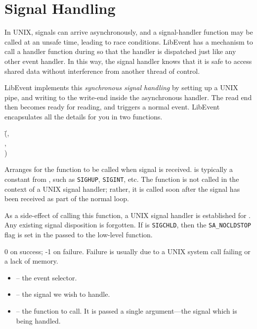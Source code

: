 \documentclass{article}
\newcommand{\Le}{\textsf{LibEvent}}
\begin{document}
\section{Signal Handling}

In UNIX, signals can arrive asynchronously, and a signal-handler
function may be called at an unsafe time, leading to race conditions.
\Le{} has a mechanism to call a handler function during
 so that the handler is dispatched just like
any other event handler.  In this way, the signal handler knows that
it is safe to access shared data without interference from another
thread of control.

\Le{} implements this \emph{synchronous signal handling} by setting up
a UNIX pipe, and writing to the write-end inside the asynchronous
handler.  The read end then becomes ready for reading, and triggers
a normal event.  \Le{} encapsulates all the details for you in
two functions.

{(\=,\\
  \> ,\\
  \> \type{)})}
{Arranges for the function  to be called when signal
   is received.   is typically a constant from
  , such as \texttt{SIGHUP}, \texttt{SIGINT}, etc.
  The  function is not called in the context of a UNIX
  signal handler; rather, it is called soon after the signal has been
  received as part of the normal  loop.

  As a side-effect of calling this function, a UNIX signal handler
  is established for .  Any existing signal disposition is
  forgotten.  If  is \texttt{SIGCHLD}, then the
  \texttt{SA\_NOCLDSTOP} flag is set in the  passed
  to the low-level  function.}
{0 on success; -1 on failure.  Failure is usually due to a UNIX system
  call failing or a lack of memory.}
\begin{itemize}
\item {} -- the event selector.
\item {} -- the signal we wish to handle.
\item {} -- the function to call.  It is passed a single
  argument---the signal which is being handled.
\end{itemize}
\end{document}
